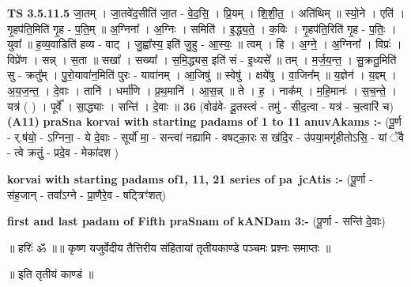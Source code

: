 \documentclass[17pt]{extarticle}
\begin{document}
                  \newline
                                \textbf{ TS 3.5.11.5} \newline
                  जा॒तम् । जा॒तवे॑द॒सीति॑ जा॒त - वे॒द॒सि॒ । प्रि॒यम् । शि॒शी॒त॒ । अति॑थिम् ॥ स्यो॒ने । एति॑ । गृ॒हप॑ति॒मिति॑ गृ॒ह - प॒ति॒म् ॥ अ॒ग्निना᳚ । अ॒ग्निः । समिति॑ । इ॒द्ध्य॒ते॒ । क॒विः । गृ॒हप॑ति॒रिति॑ गृ॒ह - प॒तिः॒ । युवा᳚ ॥ ह॒व्य॒वाडिति॑ हव्य - वाट् । जु॒ह्वा᳚स्य॒ इति॑ जु॒हु - आ॒स्यः॒ ॥ त्वम् । हि । अ॒ग्ने॒ । अ॒ग्निना᳚ । विप्रः॑ । विप्रे॑ण । सन्न् । स॒ता ॥ सखा᳚ । सख्या᳚ । स॒मि॒द्ध्यस॒ इति॑ सं - इ॒ध्यसे᳚ ॥ तम् । म॒र्ज॒य॒न्त॒ । सु॒क्रतु॒मिति॑ सु - क्रतु᳚म् । पु॒रो॒यावा॑न॒मिति॑ पुरः - यावा॑नम् । आ॒जिषु॑ ॥ स्वेषु॑ । क्षये॑षु । वा॒जिन᳚म् ॥ य॒ज्ञेन॑ । य॒ज्ञ्म् । अ॒य॒ज॒न्त॒ । दे॒वाः । तानि॑ । धर्मा॑णि । प्र॒थ॒मानि॑ । आ॒स॒न्न् ॥ ते । ह॒ । नाक᳚म् । म॒हि॒मानः॑ । स॒च॒न्ते॒ । यत्र॑ ( ) । पूर्वे᳚ । सा॒द्ध्याः । सन्ति॑ । दे॒वाः ॥ \textbf{  36} \newline
                  \newline
                      (वोढ॑वे- दू॒तस्त्वं - तमु॑ - सीद॒त्वा - यत्र॑ - च॒त्वारि॑ च)  \textbf{(A11)} \newline \newline
\textbf{praSna korvai with starting padams of 1 to 11 anuvAkams :-} \newline
(पू॒र्ण - र्.ष॑यो॒ - ऽग्निना॒ - ये दे॒वाः - सूर्यो॑ मा॒ - सन्त्वा॑ नह्यामि - वषट्का॒रः स ख॑दि॒र - उ॑पया॒मगृ॑हीतोऽसि॒ - यां ॅवै - त्वे क्रतुं॒ - प्रदे॒व - मेका॑दश ) \newline

\textbf{korvai with starting padams of1, 11, 21 series of pa~jcAtis :-} \newline
(पू॒र्णा - स॑ह॒जान् - तवा᳚ऽग्ने - प्रा॒णैरे॒व - षट्त्रिꣳ॑शत्) \newline

\textbf{first and last padam of Fifth praSnam of kANDam 3:-} \newline
(पू॒र्णा - सन्ति॑ दे॒वाः) \newline 


॥ हरिः॑ ॐ ॥॥ कृष्ण यजुर्वेदीय तैत्तिरीय संहितायां तृतीयकाण्डे पञ्चमः प्रश्नः समाप्तः ॥

॥ इति तृतीयं काण्डं ॥ \newline
\pagebreak
\pagebreak
        
\end{document}
